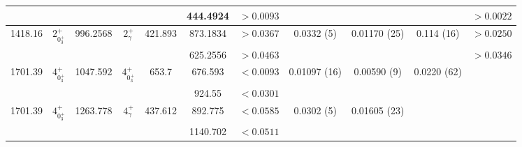 \begin{landscape}
\begin{longtable}{>{\footnotesize}c|>{\footnotesize}c|>{\footnotesize}c|>{\footnotesize}c|>{\footnotesize}c|>{\footnotesize}c|>{\footnotesize}c|>{\footnotesize}c|>{\footnotesize}c|>{\footnotesize}c|>{\footnotesize}c}
        &  & &  &  & 444.4924 & $>0.0093$ &  & & & $>0.0022$\\ \hline
        1418.16 &  $2^+_{0^+_3}$ & 996.2568 &  $2^+_{\gamma}$ & 421.893 & 873.1834 & $>0.0367$ & 0.0332 (5) & 0.01170 (25) & 0.114 (16) & $>0.0250$\\
        &  & &  &  & 625.2556 & $>0.0463$ & & & & $>0.0346$\\ \hline
        1701.39 & $4^+_{0^+_3}$ & 1047.592 & $4^+_{0^+_3}$ & 653.7 & 676.593 & $<0.0093$ & 0.01097 (16) & 0.00590 (9) & 0.0220 (62)  & \\
        &  & &  &  & 924.55 & $<0.0301$ & & & &\\ \hline
        1701.39 & $4^+_{0^+_3}$ & 1263.778 & $4^+_{\gamma}$ & 437.612 & 892.775 & $<0.0585$ & 0.0302 (5) & 0.01605 (23) &  & \\
        &  & &  &  & 1140.702 & $<0.0511$ & & &  & \\ 
        \bottomrule
    \end{longtable}
\end{landscape}